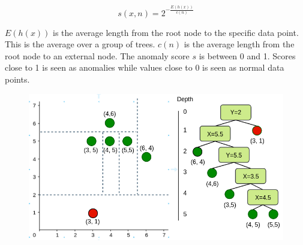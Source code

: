 \begin{equation}
  s(x,n) = 2^{-\frac{E(h(x))}{c(n)}}
  \label{eq:org_score}
\end{equation}

$E(h(x))$ is the average length from the root node to the specific data point. This is the average over a group of trees. $c(n)$ is the average length from the root node to an external node. The anomaly score $s$ is between 0 and 1.   
Scores close to 1 is seen as anomalies while values close to 0 is seen as normal data points. 
\begin{figure}
  \centering
  \includegraphics[width=\linewidth]{images/rich_sketch_original.png}
  \caption{}
  \label{fig:rich_sketch_original}
\end{figure}